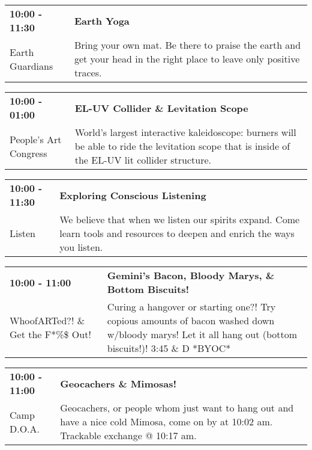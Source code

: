 \begin{tabular}{ p{1in} p{2.2in} }
    \textbf{10:00 - 11:30} & \textbf{Earth Yoga} \\
    Earth Guardians \newline  & Bring your own mat. Be there to praise the earth and get your head in the right place to leave only positive traces. \\
    \hline 
\end{tabular}
    
\begin{tabular}{ p{1in} p{2.2in} }
    \textbf{10:00 - 01:00} & \textbf{EL-UV Collider \& Levitation Scope} \\
    People's Art Congress \newline  & World's largest interactive kaleidoscope: burners will be able to ride the levitation scope that is inside of the EL-UV lit collider structure. \\
    \hline 
\end{tabular}
    
\begin{tabular}{ p{1in} p{2.2in} }
    \textbf{10:00 - 11:30} & \textbf{Exploring Conscious Listening} \\
    Listen \newline  & We believe that when we listen our spirits expand. Come learn tools and resources to deepen and enrich the ways you listen. \\
    \hline 
\end{tabular}
    
\begin{tabular}{ p{1in} p{2.2in} }
    \textbf{10:00 - 11:00} & \textbf{Gemini's Bacon, Bloody Marys, \& Bottom Biscuits!} \\
    WhoofARTed?! \& Get the F*\%\$ Out! \newline  & Curing a hangover or starting one?! Try copious amounts of bacon washed down w/bloody marys! Let it all hang out (bottom biscuits!)! 3:45 \& D *BYOC* \\
    \hline 
\end{tabular}
    
\begin{tabular}{ p{1in} p{2.2in} }
    \textbf{10:00 - 11:00} & \textbf{Geocachers \& Mimosas!} \\
    Camp D.O.A. \newline  & Geocachers, or people whom just want to hang out and have a nice cold Mimosa, come on by at 10:02 am. Trackable exchange @ 10:17 am. \\
    \hline 
\end{tabular}
    
